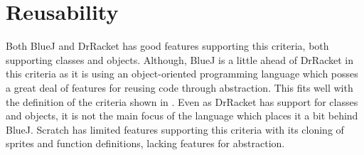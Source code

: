 \section{Reusability}
\label{sec:reusability}
Both BlueJ and DrRacket has good features supporting this criteria, both supporting classes and objects. Although, BlueJ is a little ahead of DrRacket in this criteria as it is using an object-oriented programming language which posses a great deal of features for reusing code through abstraction. This fits well with the definition of the criteria shown in . Even as DrRacket has support for classes and objects, it is not the main focus of the language which places it a bit behind BlueJ. Scratch has limited features supporting this criteria with its cloning of sprites and function definitions, lacking features for abstraction.